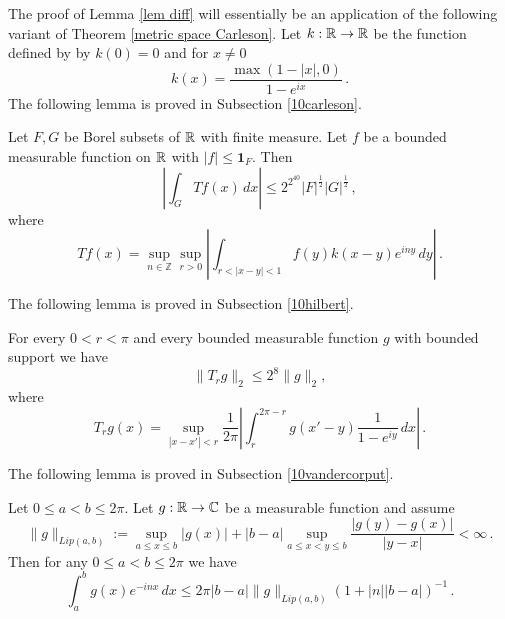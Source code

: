 {The proof of Lemma \ref{lem diff} will essentially be
an application of
the following variant of Theorem \ref{metric space Carleson}.
Let  $k:\mathbb{R}\to \mathbb{R}$ be the function defined by
by $k(0)=0$ and for $x\neq 0$
\begin{equation}\label{eq hilker}
k(x)=\frac {\max (1-|x|, 0)}{1-e^{ix}}\, .
\end{equation}
The following lemma is proved in Subsection \ref{10carleson}.
\begin{lemma}\label{lem rcarleson}
    Let $F,G$ be Borel subsets of $\mathbb{R}$ with finite measure. Let $f$ be a bounded measurable function on $\mathbb{R}$ with $|f|\le \mathbf{1}_F$. Then
\begin{equation}
    |\int _G Tf(x) \, dx| \le 2^{2^{40}}|F|^{\frac 12} |G|^{\frac 12} \, ,
\end{equation}
where
\begin{equation}
    T f(x)=\sup_{n\in \mathbb{Z}}
    \sup_{r>0}\left|\int_{r<|x-y|<1} f(y)k(x-y) e^{iny}\, dy\right|\, .
\end{equation}
\end{lemma}


The following lemma is proved in Subsection \ref{10hilbert}. 
\begin{lemma}\label{lem hilbert}
    For every $0<r<\pi$ and every  bounded measurable function $g$ with bounded support we have
\begin{equation}
    \|T_rg\|_2\le 2^8\|g\|_2,
\end{equation}
where
\begin{equation}
    T_r g(x)=\sup_{|x-x'|<r}\frac 1{2\pi} \left|\int_{r}^{2\pi -r}
g(x'-y) \frac 1{1-e^{iy}}\, dx\right|\, .
\end{equation}
\end{lemma}
The following lemma is proved in Subsection \ref{10vandercorput}. 
\begin{lemma}\label{lem vdc}
    Let $0\le a<b\le 2\pi$. Let $g:\mathbb{R}\to \mathbb{C}$ be a  measurable function and assume
    \begin{equation}
        \|g\|_{Lip(a,b)}:=\sup_{a\le x\le b}|g(x)|+|b-a|
        \sup_{a\le x<y\le b} \frac {|g(y)-g(x)|}{|y-x|}<\infty\, .
    \end{equation}
    Then for any $0\le a<b\le 2\pi$ we have
    \begin{equation}
        \int _{a}^{b} g(x) e^{-inx}\, dx\le 2\pi |b-a|\|g\|_{Lip(a,b)}(1+|n||b-a|)^{-1}\, .
    \end{equation}


\end{lemma}}
